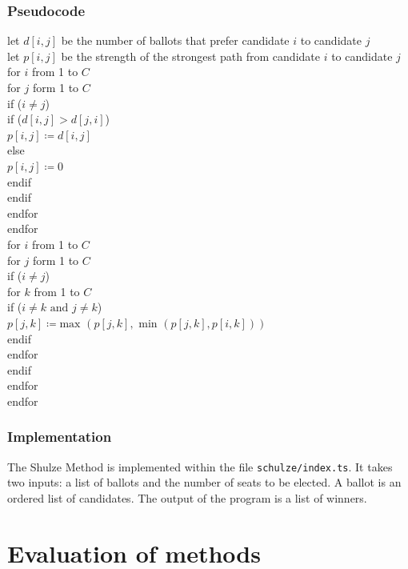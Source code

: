 \documentclass[12pt]{article}
\newcommand\tab[1][1cm]{\hspace*{#1}}
\begin{document}
\subsubsection{Pseudocode}
\label{Schulze psuedocode}
let $d[i,j]$ be the number of ballots that prefer candidate $i$ to candidate $j$\\
let $p[i,j]$ be the strength of the strongest path from candidate $i$ to candidate $j$\\
for $i$ from 1 to $C$\\
\tab for $j$ form 1 to $C$\\
\tab\tab if ($i \ne j$)\\
\tab\tab\tab if ($d[i,j] > d[j,i]$)\\
\tab\tab\tab\tab $p[i,j] \coloneqq d[i,j]$\\
\tab\tab\tab else\\
\tab\tab\tab\tab $p[i,j] \coloneqq 0$\\
\tab\tab\tab endif \\
\tab\tab endif \\
\tab endfor \\
endfor\\
for $i$ from 1 to $C$\\
\tab for $j$ form 1 to $C$\\
\tab\tab if ($i \ne j$)\\
\tab\tab\tab for $k$ from 1 to $C$\\
\tab\tab\tab\tab if ($i \ne k \text{ and } j \ne k$)\\
\tab\tab\tab\tab\tab $p[j,k] \coloneqq \text{max }(p[j,k], \text{ min }(p[j,k], p[i,k]))$\\
\tab\tab\tab\tab endif \\
\tab\tab\tab endfor \\
\tab\tab endif \\
\tab endfor \\
endfor\\
\subsubsection{Implementation}
The Shulze Method is implemented within the file \texttt{schulze/index.ts}. It takes two inputs: a list of ballots and the number of seats to be elected. A ballot is an ordered list of candidates. The output of the program is a list of winners.
\section{Evaluation of methods}
\end{document}
